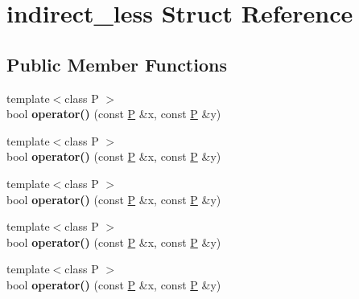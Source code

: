 \hypertarget{structindirect__less}{}\section{indirect\+\_\+less Struct Reference}
\label{structindirect__less}
\subsection*{Public Member Functions}
\begin{DoxyCompactItemize}
\item 
\mbox{\label{structindirect__less_a1e9e685e691e16438cc36c9b06aa8386}} 
{\footnotesize template$<$class P $>$ }\\bool {\bfseries operator()} (const \mbox{\hyperlink{struct_p}{P}} \&x, const \mbox{\hyperlink{struct_p}{P}} \&y)
\item 
\mbox{\label{structindirect__less_a1e9e685e691e16438cc36c9b06aa8386}} 
{\footnotesize template$<$class P $>$ }\\bool {\bfseries operator()} (const \mbox{\hyperlink{struct_p}{P}} \&x, const \mbox{\hyperlink{struct_p}{P}} \&y)
\item 
\mbox{\label{structindirect__less_a1e9e685e691e16438cc36c9b06aa8386}} 
{\footnotesize template$<$class P $>$ }\\bool {\bfseries operator()} (const \mbox{\hyperlink{struct_p}{P}} \&x, const \mbox{\hyperlink{struct_p}{P}} \&y)
\item 
\mbox{\label{structindirect__less_a1e9e685e691e16438cc36c9b06aa8386}} 
{\footnotesize template$<$class P $>$ }\\bool {\bfseries operator()} (const \mbox{\hyperlink{struct_p}{P}} \&x, const \mbox{\hyperlink{struct_p}{P}} \&y)
\item 
\mbox{\label{structindirect__less_a1e9e685e691e16438cc36c9b06aa8386}} 
{\footnotesize template$<$class P $>$ }\\bool {\bfseries operator()} (const \mbox{\hyperlink{struct_p}{P}} \&x, const \mbox{\hyperlink{struct_p}{P}} \&y)
\item 
\mbox{\label{structindirect__less_a1e9e685e691e16438cc36c9b06aa8386}} 

\end{DoxyCompactItemize}
